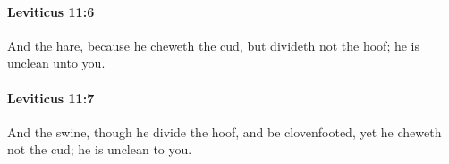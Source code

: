 		\paragraph{Leviticus 11:6} %
			\label{LEVITICUS-11-6}

			And the hare, because he cheweth the cud, but divideth not the hoof; he is unclean unto you.


		\paragraph{Leviticus 11:7} %
			\label{LEVITICUS-11-7}

			And the swine, though he divide the hoof, and be clovenfooted, yet he cheweth not the cud; he is unclean to you.


